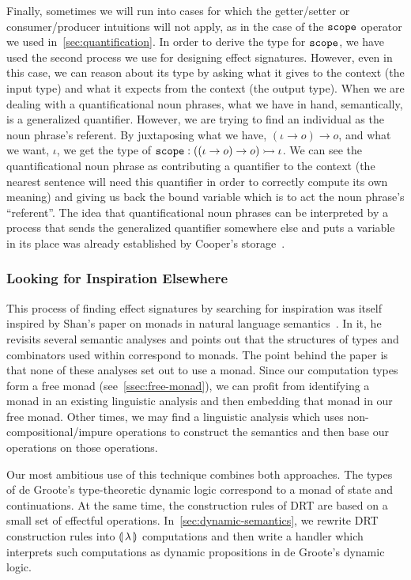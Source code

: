 Finally, sometimes we will run into cases for which the getter/setter or
consumer/producer intuitions will not apply, as in the case of the
$\mathtt{scope}$ operator we used in~\ref{sec:quantification}. In order to
derive the type for $\mathtt{scope}$, we have used the second process we use
for designing effect signatures. However, even in this case, we can reason
about its type by asking what it gives to the context (the input type) and
what it expects from the context (the output type). When we are dealing
with a quantificational noun phrases, what we have in hand, semantically,
is a generalized quantifier. However, we are trying to find an individual
as the noun phrase's referent. By juxtaposing what we have,
$(\iota \to o) \to o$, and what we want, $\iota$, we get the type of
$\mathtt{scope} : ((\iota \to o) \to o) \rightarrowtail \iota$. We can see the
quantificational noun phrase as contributing a quantifier to the context
(the nearest sentence will need this quantifier in order to correctly
compute its own meaning) and giving us back the bound variable which is to
act the noun phrase's ``referent''. The idea that quantificational noun
phrases can be interpreted by a process that sends the generalized
quantifier somewhere else and puts a variable in its place was already
established by Cooper's storage~\cite{cooper1979montague}.


\subsubsection{Looking for Inspiration Elsewhere}

This process of finding effect signatures by searching for inspiration was
itself inspired by Shan's paper on monads in natural language
semantics~\cite{shan2002monads}. In it, he revisits several semantic
analyses and points out that the structures of types and combinators used
within correspond to monads. The point behind the paper is that none of
these analyses set out to use a monad. Since our computation types form a
free monad (see~\ref{ssec:free-monad}), we can profit from identifying a
monad in an existing linguistic analysis and then embedding that monad in
our free monad. Other times, we may find a linguistic analysis which uses
non-compositional/impure operations to construct the semantics and then
base our operations on those operations.

Our most ambitious use of this technique combines both approaches. The
types of de Groote's type-theoretic dynamic logic correspond to a monad of
state and continuations. At the same time, the construction rules of DRT
are based on a small set of effectful
operations. In~\ref{sec:dynamic-semantics}, we rewrite DRT construction
rules into $\llparenthesis \, \lambda \, \rrparenthesis$ computations and then write a handler which
interprets such computations as dynamic propositions in de Groote's dynamic
logic.


